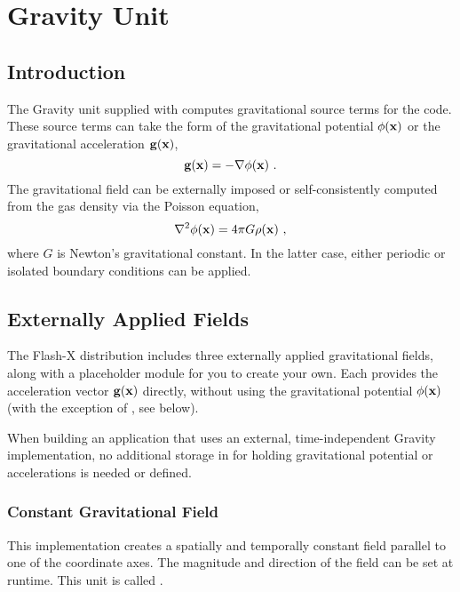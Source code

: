 \chapter{Gravity Unit}
\label{chp:Gravity}


\section{Introduction}

The \unit{Gravity} unit supplied with \flashx computes gravitational source
terms for the code.
These source terms can take the form of the gravitational potential
$\phi({\bf x})$ or the gravitational acceleration ${\bf g}({\bf x})$,
\begin{equation}
{\bf g}({\bf x}) = -\nabla \phi({\bf x})\ .
\end{equation}
The gravitational field can be externally imposed or self-consistently
computed from the gas density via the Poisson equation,
\begin{equation}
\label{Eqn:Poisson}
\nabla^2\phi({\bf x}) = 4\pi G \rho({\bf x})\ ,
\end{equation}
where $G$ is Newton's gravitational constant.
In the latter case, either periodic or isolated boundary conditions can
be applied.


\section{Externally Applied Fields}
\label{Sec:GravityExternal}
The Flash-X distribution includes three externally applied gravitational
fields, along with a placeholder module for you to create your own. Each
provides the acceleration vector ${\bf g}({\bf x})$ directly, without using
the gravitational potential $\phi({\bf x})$ (with the exception of
, see below).

When building an application that uses an external, time-independent
\unit{Gravity} implementation, no additional storage in 
for holding gravitational potential or accelerations is needed
or defined.

\subsection{Constant Gravitational Field}
This implementation creates
a spatially and temporally constant field parallel to one of the
coordinate axes. The magnitude and direction of the field can be set
at runtime.  This unit is called .

